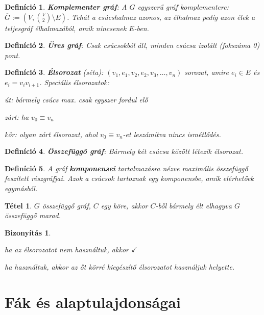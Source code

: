 \documentclass[a4paper,12pt,twoside]{book}
\newtheorem{defi}{Definíció}[chapter]
\newtheorem{tetel}{Tétel}[chapter]
\theoremstyle{break}
\newtheorem{bizNL}[biz]{Bizonyítás}
\begin{document}
\begin{defi}
 \textbf{Komplementer gráf}: A $G$ egyszerű gráf komplementere: $\overline{G} := \left(V, \binom{V}{2}\setminus E\right)$. Tehát a csúcshalmaz azonos, az élhalmaz pedig azon élek a teljesgráf élhalmazából, amik nincsenek $E$-ben.
\end{defi}

\begin{defi}
 \textbf{Üres gráf}: Csak csúcsokból áll, minden csúcsa izolált (fokszáma 0) pont.
\end{defi}

\begin{defi}
 \textbf{Élsorozat} (séta): $(v_1,e_1,v_2,e_2,v_3,\ldots, v_n)$ sorozat, amire $e_i\in E$ és $e_i = v_iv_{i+1}$. Speciális élsorozatok:
\begin{itemize*}
 \item \emph{út}: bármely csúcs max. csak egyszer fordul elő 
 \item \emph{zárt}: ha $v_0 \equiv v_n$
 \item \emph{kör}: olyan zárt élsorozat, ahol $v_0 \equiv v_n$-et leszámítva nincs ismétlődés.
\end{itemize*}
\end{defi}

\begin{defi}
 \textbf{Összefüggő gráf}: Bármely két csúcsa között létezik élsorozat.
\end{defi}

\begin{defi}
 A gráf \textbf{komponensei} tartalmazásra nézve maximális összefüggő feszített rész\-gráfjai. Azok a csúcsok tartoznak egy komponensbe, amik elérhetőek egymásból.
\end{defi}

\begin{tetel}
 $G$ összefüggő gráf, $C$ egy köre, akkor $C$-ből bármely élt elhagyva $G$ összefüggő marad.
\end{tetel}
\begin{bizNL}
 \begin{itemize*}
  \item ha az élsorozatot nem használtuk, akkor $\checkmark$
  \item ha használtuk, akkor az őt körré kiegészítő élsorozatot használjuk helyette.
 \end{itemize*}
\end{bizNL}

\section{Fák és alaptulajdonságai}
\end{document}
